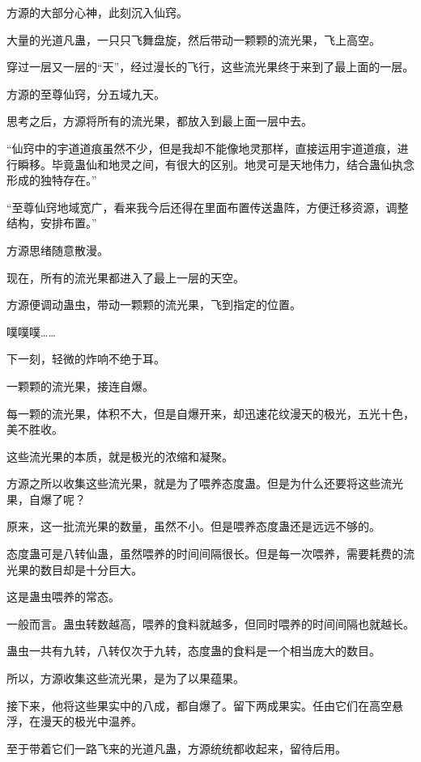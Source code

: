 
\begin{this_body}

方源的大部分心神，此刻沉入仙窍。

大量的光道凡蛊，一只只飞舞盘旋，然后带动一颗颗的流光果，飞上高空。

穿过一层又一层的“天”，经过漫长的飞行，这些流光果终于来到了最上面的一层。

方源的至尊仙窍，分五域九天。

思考之后，方源将所有的流光果，都放入到最上面一层中去。

“仙窍中的宇道道痕虽然不少，但是我却不能像地灵那样，直接运用宇道道痕，进行瞬移。毕竟蛊仙和地灵之间，有很大的区别。地灵可是天地伟力，结合蛊仙执念形成的独特存在。”

“至尊仙窍地域宽广，看来我今后还得在里面布置传送蛊阵，方便迁移资源，调整结构，安排布置。”

方源思绪随意散漫。

现在，所有的流光果都进入了最上一层的天空。

方源便调动蛊虫，带动一颗颗的流光果，飞到指定的位置。

噗噗噗……

下一刻，轻微的炸响不绝于耳。

一颗颗的流光果，接连自爆。

每一颗的流光果，体积不大，但是自爆开来，却迅速花纹漫天的极光，五光十色，美不胜收。

这些流光果的本质，就是极光的浓缩和凝聚。

方源之所以收集这些流光果，就是为了喂养态度蛊。但是为什么还要将这些流光果，自爆了呢？

原来，这一批流光果的数量，虽然不小。但是喂养态度蛊还是远远不够的。

态度蛊可是八转仙蛊，虽然喂养的时间间隔很长。但是每一次喂养，需要耗费的流光果的数目却是十分巨大。

这是蛊虫喂养的常态。

一般而言。蛊虫转数越高，喂养的食料就越多，但同时喂养的时间间隔也就越长。

蛊虫一共有九转，八转仅次于九转，态度蛊的食料是一个相当庞大的数目。

所以，方源收集这些流光果，是为了以果蕴果。

接下来，他将这些果实中的八成，都自爆了。留下两成果实。任由它们在高空悬浮，在漫天的极光中温养。

至于带着它们一路飞来的光道凡蛊，方源统统都收起来，留待后用。


\end{this_body}
